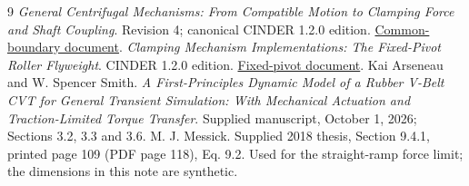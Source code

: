 \documentclass[11pt,letterpaper]{article}
\numberwithin{equation}{section}
\begin{document}
\begin{thebibliography}{9}
 \emph{General Centrifugal Mechanisms: From Compatible Motion to
Clamping Force and Shaft Coupling}. Revision 4; canonical CINDER 1.2.0 edition.
\href{../common_boundary/formulation.pdf}{Common-boundary document}.
 \emph{Clamping Mechanism Implementations: The Fixed-Pivot Roller
Flyweight}. CINDER 1.2.0 edition.
\href{../fixed_pivot/formulation.pdf}{Fixed-pivot document}.
 Kai Arseneau and W. Spencer Smith.
\emph{A First-Principles Dynamic Model of a Rubber V-Belt CVT for General
Transient Simulation: With Mechanical Actuation and Traction-Limited Torque
Transfer}. Supplied manuscript, October 1, 2026; Sections 3.2, 3.3 and 3.6.
 M. J. Messick. Supplied 2018 thesis, Section 9.4.1,
printed page 109 (PDF page 118), Eq. 9.2. Used for the straight-ramp force limit;
the dimensions in this note are synthetic.
\end{thebibliography}
\end{document}
